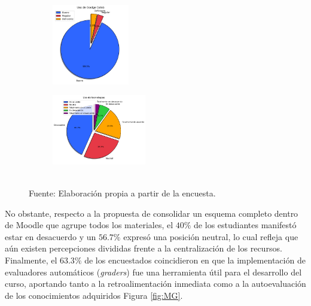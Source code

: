 \documentclass[letter,oneside,12pt,spanish]{report}
\begin{document}
\begin{figure}[h]
	\centering
    \begin{subfigure}
        \centering
        \includegraphics[width=0.37\textwidth]{Figs/uso_colab.pdf}
    \end{subfigure}
	\hfill
    \begin{subfigure}
        \centering
        \includegraphics[width=0.45\textwidth]{Figs/uso_tecnologias.pdf}
    \end{subfigure}
	\label{fig:CT}
	\\ Fuente: Elaboración propia a partir de la encuesta.
\end{figure}

No obstante, respecto a la propuesta de consolidar un esquema completo dentro de Moodle que agrupe todos los materiales, el $40\%$ de los estudiantes manifestó estar en desacuerdo y un $56.7\%$ expresó una posición neutral, lo cual refleja que aún existen percepciones divididas frente a la centralización de los recursos.
Finalmente, el $63.3\%$ de los encuestados coincidieron en que la implementación de evaluadores automáticos (\textit{graders}) fue una herramienta útil para el desarrollo del curso, aportando tanto a la retroalimentación inmediata como a la autoevaluación de los conocimientos adquiridos Figura \ref{fig:MG}.
\end{document}
